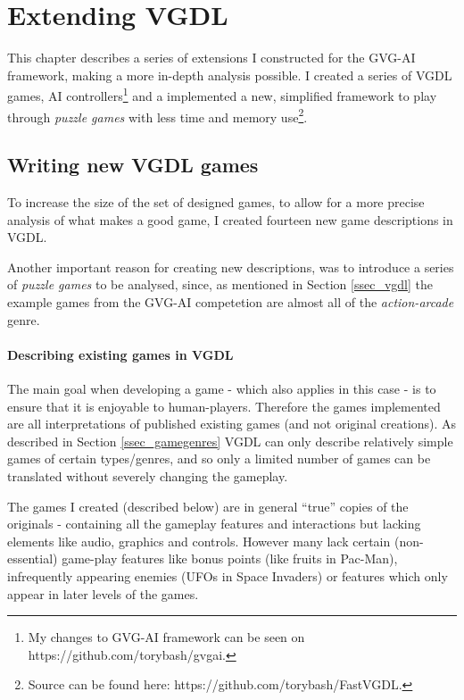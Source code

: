 \documentclass[a4paper,titlepage,final]{report}
\begin{document}
\chapter{Extending VGDL}
\label{ch_extending}
This chapter describes a series of extensions I constructed for the GVG-AI framework, making a more in-depth analysis possible.
I created a series of VGDL games, AI controllers\footnote{My changes to GVG-AI framework can be seen on https://github.com/torybash/gvgai.} and a implemented a new, simplified framework to play through \textit{puzzle games} with less time and memory use\footnote{Source can be found here: https://github.com/torybash/FastVGDL.}.


\section{Writing new VGDL games}
\label{sec_writingnewvgdl}
To increase the size of the set of designed games, to allow for a more precise analysis of what makes a good game, I created fourteen new game descriptions in VGDL. 

Another important reason for creating new descriptions, was to introduce a series of \textit{puzzle games} to be analysed, since, as mentioned in Section \ref{ssec_vgdl} the example games from the GVG-AI competetion are almost all of the \textit{action-arcade} genre.


\subsubsection*{Describing existing games in VGDL}
The main goal when developing a game - which also applies in this case - is to ensure that it is enjoyable to human-players. 
Therefore the games implemented are all interpretations of published existing games (and not original creations).
As described in Section \ref{ssec_gamegenres} VGDL can only describe relatively simple games of certain types/genres, and so only a limited number of games can be translated without severely changing the gameplay.

The games I created (described below) are in general ``true'' copies of the originals - containing all the gameplay features and interactions but lacking elements like audio, graphics and controls. 
However many lack certain (non-essential) game-play features like bonus points (like fruits in Pac-Man), infrequently appearing enemies (UFOs in Space Invaders) or features which only appear in later levels of the games.
\end{document}
